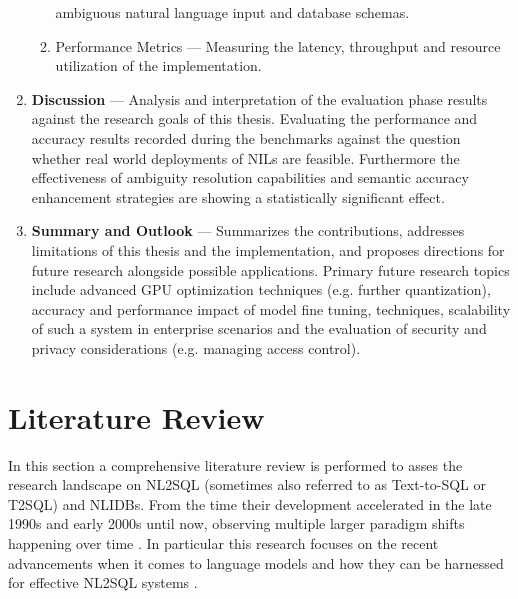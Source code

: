 \documentclass{article}
\begin{document}
\begin{enumerate}
\begin{enumerate}
                    ambiguous natural language input and database schemas.
              \item Performance Metrics — Measuring the latency, throughput and resource utilization 
                    of the implementation.
          \end{enumerate}
      \item \textbf{Discussion} — Analysis and interpretation of the evaluation phase results against
            the research goals of this thesis. Evaluating the performance and accuracy results recorded
            during the benchmarks against the question whether real world deployments of NILs are feasible.
            Furthermore the effectiveness of ambiguity resolution capabilities and semantic accuracy enhancement
            strategies are showing a statistically significant effect.
       \item \textbf{Summary and Outlook} — Summarizes the contributions, addresses limitations
            of this thesis and the implementation, and proposes directions for future research alongside
            possible applications. Primary future research topics include advanced GPU optimization
            techniques (e.g. further quantization), accuracy and performance impact of model fine tuning,
            techniques, scalability of such a system in enterprise scenarios and the evaluation of security
            and privacy considerations (e.g. managing access control).
\end{enumerate}

\newpage

\section{Literature Review}


In this section a comprehensive literature review is performed to asses the research landscape on NL2SQL
(sometimes also referred to as Text-to-SQL or T2SQL) and NLIDBs. From the time their development accelerated in
the late 1990s and early 2000s \citep{NLIDBs, NLIDBTheory, ILPParsing, ILPParsing2} until now, observing multiple 
larger paradigm shifts happening over time \citep{GRAPPA, STRUG, Seq2SQL, NALIR, SQLizer}. In particular this 
research focuses on the recent advancements when it comes to language models and how they can be harnessed for
effective NL2SQL systems \citep{LLM-Sql, DAIL-SQL, T2SQL-LLM-Bench-2, T2SQL-LLM-Bench-3, Spider2, BIRD}.
\end{document}
